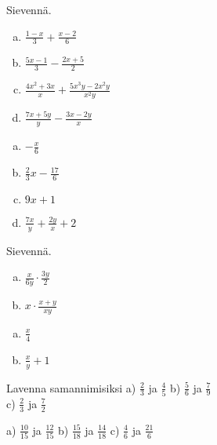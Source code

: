 \begin{tehtava}
Sievennä.
	\begin{enumerate}[a)]
	\item $ \frac{1-x}{3} + \frac{x-2}{6}$
	\item $ \frac{5x-1}{3} - \frac{2x+5}{2}$
	\item $\frac{4x^2+3x}{x} + \frac{5x^3y-2x^2y}{x^2y}$
	\item $\frac{7x+5y}{y} - \frac{3x-2y}{x}$
	\end{enumerate}

\begin{vastaus}
	\begin{enumerate}[a)]
	\item $ -\frac{x}{6}$
	\item $ \frac{2}{3} x - \frac{17}{6}$
	\item $9x+1$
	\item $\frac{7x}{y} + \frac{2y}{x} +2$
	\end{enumerate}
\end{vastaus}
\end{tehtava}

\begin{tehtava}
Sievennä.
	\begin{enumerate}[a)]
	\item $\frac{x}{6y} \cdot \frac{3y}{2}$
	\item $x \cdot \frac{x+y}{xy}$
	\end{enumerate}

\begin{vastaus}
	\begin{enumerate}[a)]
	\item $\frac{x}{4}$
	\item $\frac{x}{y} + 1$
	\end{enumerate}
\end{vastaus}
\end{tehtava}



\begin{tehtava}
Lavenna samannimisiksi \quad
a) $\frac{2}{3}$ ja $\frac{4}{5}$ \quad b) $\frac{5}{6}$ ja $\frac{7}{9}$ \quad \\ c) $\frac{2}{3}$ ja $\frac{7}{2}$ 
\begin{vastaus}
a) $\frac{10}{15}$ ja $\frac{12}{15}$ \qquad b) $\frac{15}{18}$ ja $\frac{14}{18}$ \qquad c) $\frac{4}{6}$ ja $\frac{21}{6}$
\end{vastaus}
\end{tehtava}



